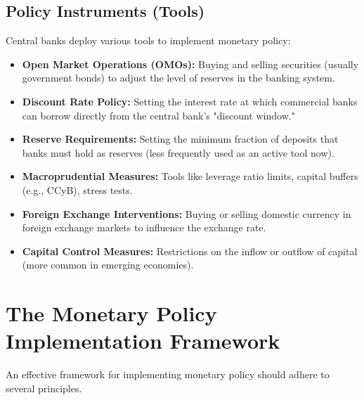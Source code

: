 \subsection{Policy Instruments (Tools)}
Central banks deploy various tools to implement monetary policy:
\begin{itemize}
    \item \textbf{Open Market Operations (OMOs):} Buying and selling securities (usually government bonds) to adjust the level of reserves in the banking system.
    \item \textbf{Discount Rate Policy:} Setting the interest rate at which commercial banks can borrow directly from the central bank's "discount window."
    \item \textbf{Reserve Requirements:} Setting the minimum fraction of deposits that banks must hold as reserves (less frequently used as an active tool now).
    \item \textbf{Macroprudential Measures:} Tools like leverage ratio limits, capital buffers (e.g., CCyB), stress tests.
    \item \textbf{Foreign Exchange Interventions:} Buying or selling domestic currency in foreign exchange markets to influence the exchange rate.
    \item \textbf{Capital Control Measures:} Restrictions on the inflow or outflow of capital (more common in emerging economies).
\end{itemize}

\section{The Monetary Policy Implementation Framework}

An effective framework for implementing monetary policy should adhere to several principles.

